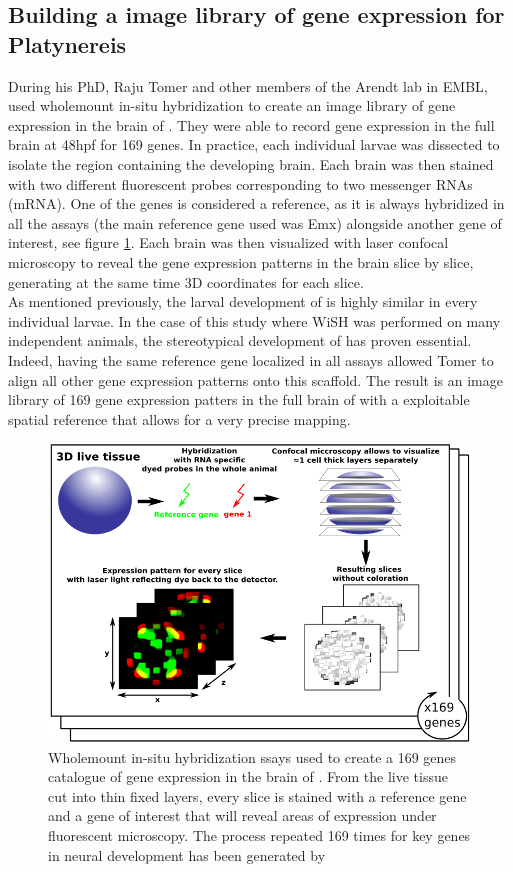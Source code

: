      \subsection{Building a image library of gene expression for Platynereis}
     During his PhD, Raju Tomer and other  members of the Arendt lab in EMBL, used wholemount in-situ hybridization to create an image library of gene expression in the brain of \platy{}. They were able to record gene expression in the full brain at 48hpf for 169 genes. In practice, each individual larvae was dissected to isolate the region containing the developing brain. Each brain was then stained with two different fluorescent probes corresponding to two messenger RNAs (mRNA). One of the genes is considered a reference, as it is always hybridized in all the assays (the main reference gene used was Emx) alongside another gene of interest, see figure \ref{fig:insitu}. Each brain was then visualized with laser confocal microscopy to reveal the gene expression patterns in the brain slice by slice, generating at the same time 3D coordinates for each slice.\\
     
     As mentioned previously, the larval development of \platy{} is highly similar in every individual larvae. In the case of this study where WiSH was performed on many independent animals, the stereotypical development of \platy{} has proven essential. Indeed, having the same reference gene localized in all assays allowed Tomer to align all other gene expression patterns onto this scaffold. The result is an image library of 169 gene expression patters in the full brain of \platy{} with a exploitable spatial reference that allows for a very precise mapping.\\
    
    \begin{figure}[bth]
\centerline{\includegraphics[width=0.9\linewidth]{gfx/chapter1/insitu.png}}
\caption{Wholemount in-situ hybridization ssays used to create a 169 genes catalogue of gene expression in the brain of \platy{}. From the live tissue cut into thin fixed layers, every slice is stained with a reference gene and a gene of interest that will reveal areas of expression under fluorescent microscopy. The process repeated 169 times for key genes in \platy{} neural development has been generated by \cite{Tomer10}}\label{fig:insitu}
	\end{figure}
	
